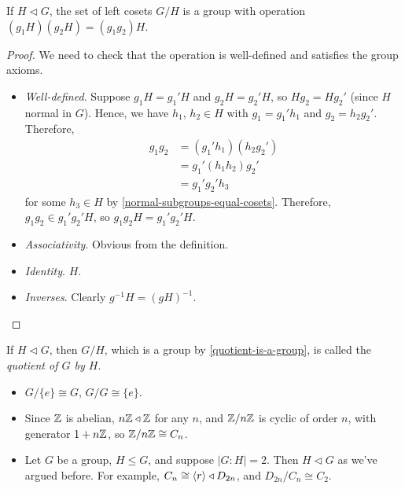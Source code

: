 \documentclass{../../template/note}
\begin{document}
    \begin{theorem}
        If \(H \triangleleft G\), the set of left cosets \(G/H\) is a group with operation \((g_1H)(g_2H) = (g_1g_2)H\).
        \label{quotient-is-a-group}
    \end{theorem}
    
    \begin{proof}
        We need to check that the operation is well-defined and satisfies the group axioms.
        \begin{itemize}
            \item \emph{Well-defined}. Suppose \(g_1H = g_1'H\) and \(g_2H = g_2'H\), so \(Hg_2 = Hg_2'\) (since \(H\) normal in \(G\)). Hence, we have \(h_1\), \(h_2 \in H\) with \(g_1 = g_1'h_1\) and \(g_2 = h_2g_2'\). Therefore,
            \begin{align*}
                g_1g_2 &= (g_1'h_1)(h_2g_2') \\
                &= g_1'(h_1h_2)g_2' \\
                &= g_1'g_2'h_3
            \end{align*}
            for some \(h_3 \in H\) by \cref{normal-subgroups-equal-cosets}. Therefore, \(g_1g_2 \in g_1'g_2'H\), so \(g_1g_2H = g_1'g_2'H\).
            \item \emph{Associativity}. Obvious from the definition.
            \item \emph{Identity}. \(H\).
            \item \emph{Inverses}. Clearly \(g^{-1}H = (gH)^{-1}\).
        \end{itemize}
    \end{proof}
    
    \begin{definition}
        If \(H \triangleleft G\), then \(G/H\), which is a group by \cref{quotient-is-a-group}, is called the \emph{quotient of \(G\) by \(H\)}.
    \end{definition}
    
    \begin{example}
        \begin{itemize}
            \item \(G/\{e\} \cong G\), \(G/G \cong \{e\}\).
            \item Since \(\mathbb Z\) is abelian, \(n\mathbb Z \triangleleft \mathbb Z\) for any \(n\), and \(\mathbb Z/n\mathbb Z\) is cyclic of order \(n\), with generator \(1 + n\mathbb Z\), so \(\mathbb Z/n\mathbb Z \cong C_n\).
            \item Let \(G\) be a group, \(H \leq G\), and suppose \(|G:H| = 2\). Then \(H \triangleleft G\) as we've argued before. For example, \(C_n \cong \left \langle r \right \rangle \triangleleft D_{2n}\), and \(D_{2n} / C_n \cong C_2\).
        \end{itemize}
    \end{example}
    
\end{document}
